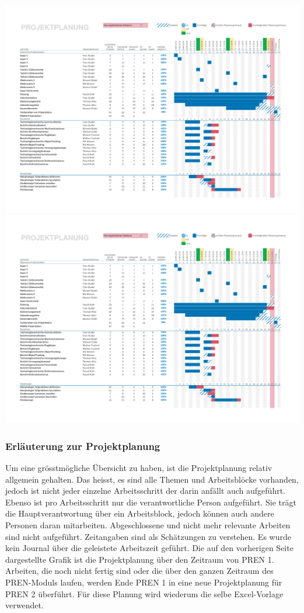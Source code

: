 \begin{landscape}
    \includegraphics[page=1,scale=0.87,clip,trim=15mm 22mm 13mm 18mm] {Enddokumentation/Projektplanung_Management/Bilder/Projekt-Planung_Team32.pdf}
    \newpage
    \includegraphics[page=2,scale=0.87,clip,trim=15mm 100mm 13mm 10mm] {Enddokumentation/Projektplanung_Management/Bilder/Projekt-Planung_Team32.pdf}
\end{landscape}
%
\subsubsection{Erläuterung zur Projektplanung}
Um eine grösstmögliche Übersicht zu haben, ist die Projektplanung relativ 
allgemein gehalten. Das heisst, es sind alle Themen und Arbeitsblöcke vorhanden, 
jedoch ist nicht jeder einzelne Arbeitsschritt der darin anfällt auch aufgeführt. 
Ebenso ist pro Arbeitsschritt nur die verantwortliche Person aufgeführt. Sie 
trägt die Hauptverantwortung über ein Arbeitsblock, jedoch können auch andere 
Personen daran mitarbeiten. Abgeschlossene und nicht mehr relevante Arbeiten 
sind nicht aufgeführt. Zeitangaben sind als Schätzungen zu verstehen. Es wurde 
kein Journal über die geleistete Arbeitszeit geführt. Die auf den vorherigen 
Seite dargestellte Grafik ist die Projektplanung über den Zeitraum von PREN 1. 
Arbeiten, die noch nicht fertig sind oder die über den ganzen Zeitraum des 
PREN-Moduls laufen, werden Ende PREN 1 in eine neue Projektplanung für PREN 2 
überführt. Für diese Planung wird wiederum die selbe Excel-Vorlage verwendet. 
%
